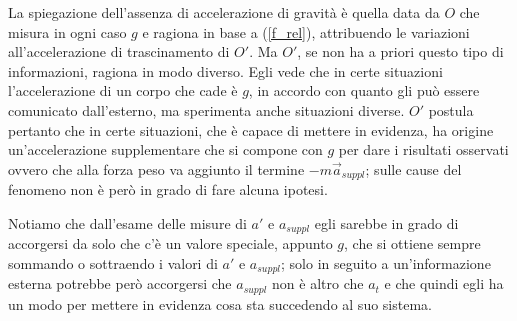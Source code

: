 \documentclass[class=book, crop=false, oneside, 12pt]{standalone}
\begin{document}
La spiegazione dell'assenza di accelerazione di gravità è quella data da \(O\) che misura in ogni caso \(g\) e ragiona in base a (\ref{f_rel}), attribuendo le variazioni all'accelerazione di trascinamento di \(O'\).
Ma \(O'\), se non ha a priori questo tipo di informazioni, ragiona in modo diverso. 
Egli vede che in certe situazioni l'accelerazione di un corpo che cade è \(g\), in accordo con quanto gli può essere comunicato dall'esterno, ma sperimenta anche situazioni diverse. 
\(O'\) postula pertanto che in certe situazioni, che è capace di mettere in evidenza, ha origine un'accelerazione supplementare che si compone con \(g\) per dare i risultati osservati ovvero che alla forza peso va aggiunto il termine \(-m \overrightarrow{a}_{suppl}\); sulle cause del fenomeno non è però in grado di fare alcuna ipotesi.

Notiamo che dall'esame delle misure di \(a'\) e \(a_{suppl}\) egli sarebbe in grado di accorgersi da solo che c'è un valore speciale, appunto \(g\), che si ottiene sempre sommando o sottraendo i valori di \(a'\) e \(a_{suppl}\); solo in seguito a un'informazione esterna potrebbe però accorgersi che \(a_{suppl}\) non è altro che \(a_t\) e che quindi egli ha un modo per mettere in evidenza cosa sta succedendo al suo sistema.
\end{document}
